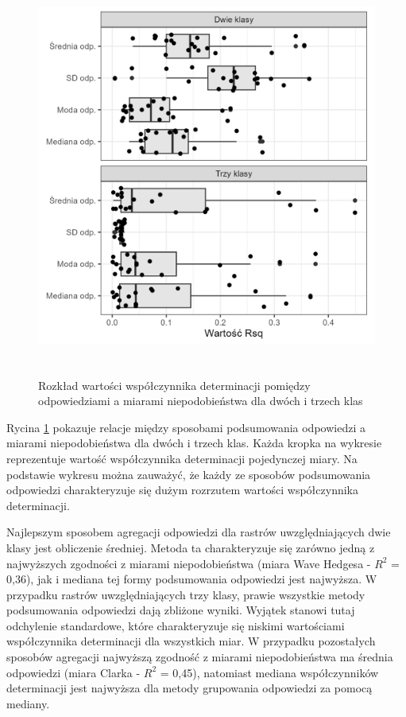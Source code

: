 \documentclass{amuthesis}
\begin{document}
\begin{figure}[t]

{\centering \includegraphics[width=5.20833in,height=5.20833in]{figures/rsq_vs_metody_agregacji_odp.png}

}

\caption{\label{fig-rsq_vs_metody_agregacji_odp}Rozkład wartości
współczynnika determinacji pomiędzy odpowiedziami a miarami
niepodobieństwa dla dwóch i trzech klas}

\end{figure}

Rycina \ref{fig-rsq_vs_metody_agregacji_odp} pokazuje relacje między
sposobami podsumowania odpowiedzi a miarami niepodobieństwa dla dwóch i
trzech klas. Każda kropka na wykresie reprezentuje wartość współczynnika
determinacji pojedynczej miary. Na podstawie wykresu można zauważyć, że
każdy ze sposobów podsumowania odpowiedzi charakteryzuje się dużym
rozrzutem wartości współczynnika determinacji.

Najlepszym sposobem agregacji odpowiedzi dla rastrów uwzględniających
dwie klasy jest obliczenie średniej. Metoda ta charakteryzuje się
zarówno jedną z najwyższych zgodności z miarami niepodobieństwa (miara
Wave Hedgesa - \(R^2\) = 0,36), jak i mediana tej formy podsumowania
odpowiedzi jest najwyższa. W przypadku rastrów uwzględniających trzy
klasy, prawie wszystkie metody podsumowania odpowiedzi dają zbliżone
wyniki. Wyjątek stanowi tutaj odchylenie standardowe, które
charakteryzuje się niskimi wartościami współczynnika determinacji dla
wszystkich miar. W przypadku pozostałych sposobów agregacji najwyższą
zgodność z miarami niepodobieństwa ma średnia odpowiedzi (miara Clarka -
\(R^2\) = 0,45), natomiast mediana współczynników determinacji jest
najwyższa dla metody grupowania odpowiedzi za pomocą mediany.
\end{document}
